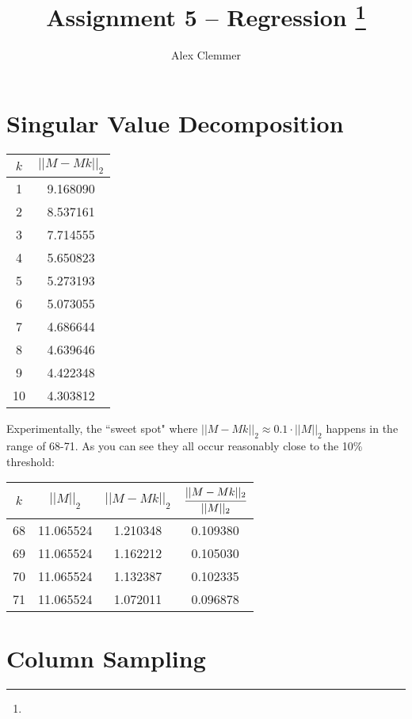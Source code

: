 \documentclass[11pt]{article}
\title{Assignment 5 -- Regression
\footnote{\s{CS 6955 Data Mining; \;\; Spring 2012 \hfill
Instructor: Jeff M. Phillips, University of Utah}
}
}
\author{Alex Clemmer}
\begin{document}
\maketitle





\section{Singular Value Decomposition}

\begin{tabular}{ | c | c | }
  \hline
  $k$ & $||M-Mk||_2$ \\
  \hline
  1 & 9.168090 \\
  \hline
  2 & 8.537161 \\
  \hline
  3 & 7.714555 \\
  \hline
  4 & 5.650823 \\
  \hline
  5 & 5.273193 \\
  \hline
  6 & 5.073055 \\
  \hline
  7 & 4.686644 \\
  \hline
  8 & 4.639646 \\
  \hline
  9 & 4.422348 \\
  \hline
  10 & 4.303812 \\
  \hline
\end{tabular}

Experimentally, the ``sweet spot" where $||M-Mk||_2 \approx 0.1 \cdot ||M||_2$ happens in the range of 68-71. As you can see they all occur reasonably close to the 10\% threshold:

\begin{tabular}{ | c | c | c | c | }
  \hline
  $k$ & $||M||_2$ & $||M-Mk||_2$ & $\cfrac{||M-Mk||_2}{||M||_2}$ \\
  \hline
  \hline
  68 & 11.065524 & 1.210348 & 0.109380 \\
  \hline
  69 & 11.065524 & 1.162212 & 0.105030 \\
  \hline
  70 & 11.065524 & 1.132387 & 0.102335 \\
  \hline
  71 & 11.065524 & 1.072011 & 0.096878 \\
  \hline
\end{tabular}




\section{Column Sampling}
\end{document}
